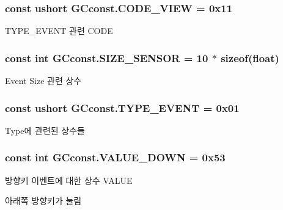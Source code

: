 \subsubsection[{C\+O\+D\+E\+\_\+\+V\+I\+E\+W}]{\setlength{\rightskip}{0pt plus 5cm}const ushort G\+Cconst.\+C\+O\+D\+E\+\_\+\+V\+I\+E\+W = 0x11}\label{class_g_cconst_a33241116bb534c10ba1a5400547a74b0}
T\+Y\+P\+E\+\_\+\+E\+V\+E\+N\+T 관련 C\+O\+D\+E \hypertarget{class_g_cconst_a13a353e3da52e3a0454487664c360dab}{}
\subsubsection[{S\+I\+Z\+E\+\_\+\+S\+E\+N\+S\+O\+R}]{\setlength{\rightskip}{0pt plus 5cm}const int G\+Cconst.\+S\+I\+Z\+E\+\_\+\+S\+E\+N\+S\+O\+R = 10 $\ast$ sizeof(float)}\label{class_g_cconst_a13a353e3da52e3a0454487664c360dab}
Event Size 관련 상수 \hypertarget{class_g_cconst_a5653aff2918dd19b3ed466d054916b51}{}
\subsubsection[{T\+Y\+P\+E\+\_\+\+E\+V\+E\+N\+T}]{\setlength{\rightskip}{0pt plus 5cm}const ushort G\+Cconst.\+T\+Y\+P\+E\+\_\+\+E\+V\+E\+N\+T = 0x01}\label{class_g_cconst_a5653aff2918dd19b3ed466d054916b51}
Type에 관련된 상수들 \hypertarget{class_g_cconst_acfcbfa00f9a29aae8b79a1bc6f87ffb4}{}
\subsubsection[{V\+A\+L\+U\+E\+\_\+\+D\+O\+W\+N}]{\setlength{\rightskip}{0pt plus 5cm}const int G\+Cconst.\+V\+A\+L\+U\+E\+\_\+\+D\+O\+W\+N = 0x53}\label{class_g_cconst_acfcbfa00f9a29aae8b79a1bc6f87ffb4}
방향키 이벤트에 대한 상수 V\+A\+L\+U\+E

아래쪽 방향키가 눌림 \hypertarget{class_g_cconst_a3907d5bdd4ff673e4a57380a701bf110}{}
